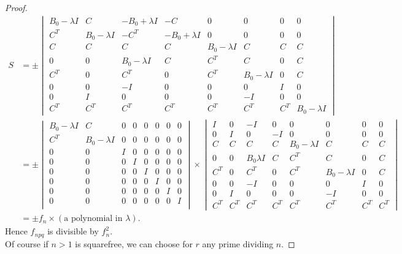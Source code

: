 \documentclass[11pt,a4paper]{amsart}
\theoremstyle{definition}
\numberwithin{equation}{section}
\begin{document}
\begin{proof}
\[
\begin{aligned}
    S&=\pm\begin{vmatrix}
        B_0 - \lambda I & C & -B_0 + \lambda I & -C & 0 & 0 & 0 & 0 \\
C^T & B_0 - \lambda I & -C^T & -B_{0}+ \lambda I & 0 & 0 & 0 & 0 \\
C & C & C & C & B_0 - \lambda I & C & C & C \\
0 & 0 & B_0 - \lambda I & C & C^T & C & 0 & C \\
C^T & 0 & C^T & 0  &C^T& B_0 - \lambda I  & 0 & C \\
0 & 0 & -I & 0 & 0 & 0 & I & 0 \\
0 & I & 0 & 0 & 0 & -I & 0 & 0 \\
C^T & C^T & C^T & C^T & C^T & C^T & C^T & B_0 - \lambda I
    \end{vmatrix}\\
&=\pm 
\begin{vmatrix}
    B_0 - \lambda I & C & 0 & 0 & 0 & 0 & 0 & 0 \\
C^T & B_0 - \lambda I & 0 & 0 & 0 & 0 & 0 & 0 \\
0 & 0 & I & 0 & 0 & 0 & 0 & 0 \\
0 & 0 & 0 & I & 0 & 0 & 0 & 0 \\
0 & 0 & 0 & 0 & I & 0 & 0 & 0 \\
0 & 0 & 0 & 0 & 0 & I & 0 & 0 \\
0 & 0 & 0 & 0 & 0 & 0 & I & 0 \\
0 & 0 & 0 & 0 & 0 & 0 & 0 & I \\
\end{vmatrix}\times
\begin{vmatrix}
I & 0 & -I & 0 & 0 & 0 & 0 & 0 \\
0 & I & 0 & -I & 0 & 0 & 0 & 0 \\
C & C & C  &C &B_0 - \lambda I & C & C & C  \\
0 & 0 & B_0 \lambda I & C& C^T & C & 0 & C  \\
C^T & 0 & C^T &0 & C^T & B_0 - \lambda I & 0 & C\\
0 & 0 & -I & 0 & 0 & 0 & I & 0 \\
0 & I & 0 & 0 & 0& -I & 0 & 0  \\
C^T & C^T & C^T & C^T & C^T & C^T & C^T & C^T
\end{vmatrix}\\
&=\pm f_n \times (\text{a polynomial in $\lambda$}).
\end{aligned}
\]
Hence $f_{npq}$ is divisible by $f_n^2$.\\
Of course if $n>1$ is squarefree, we can choose for $r$ any prime dividing $n$.
\end{proof}
\end{document}
